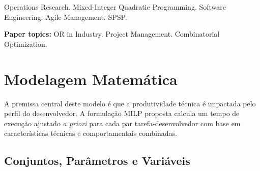 \documentclass[a4paper,11pt]{article}
\begin{document}
\begin{abstract}
    The management of development activities in software projects can be a complex
    tactical challenge, where the allocation of tasks to human resources can become
    a bottleneck. Task allocation in software projects is traditionally modeled
    considering only technical constraints. This paper proposes a Mixed-Integer Quadratically
    Constrained Programming (MIQCP) model for the Software Project Scheduling Problem (SPSP)
    that incorporates behavioral compatibility. The formulation penalizes misalignment
    through a cubic polynomial function of Solides profiles, allied with a technical
    bonus. Solving 1380 instances in the Gurobi Optimizer demonstrates that cognitive
    noise increases the makespan and mathematically validates Brooks's Law, providing
    a relevant metric for the project’s tactical planning.
\end{abstract}

\begin{keywords}
Operations Research. Mixed-Integer Quadratic Programming. Software Engineering. 
Agile Management. SPSP.

\vspace{0.3cm}
\noindent \textbf{Paper topics:} OR in Industry. Project Management.
Combinatorial Optimization.
\end{keywords}

\newpage
{}

\section{Modelagem Matemática}

A premissa central deste modelo é que a produtividade técnica é impactada pelo 
perfil do desenvolvedor. A formulação MILP proposta calcula um tempo de execução 
ajustado \textit{a priori} para cada par tarefa-desenvolvedor com base em 
características técnicas e comportamentais combinadas.

\subsection{Conjuntos, Parâmetros e Variáveis}
\end{document}
